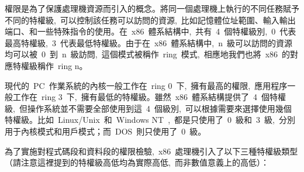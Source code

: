 權限是為了保護處理機資源而引入的概念。將同一個處理機上執行的不同任務賦予不同的特權級,~可以控制該任務可以訪問的資源,~比如記憶體位址範圍、輸入輸出端口、和一些特殊指令的使用。在~x86~體系結構中,~共有~4~個特權級別,~0~代表最高特權級,~3~代表最低特權級。由于在~x86~體系結構中,~n~級可以訪問的資源均可以被~0~到~n~級訪問,~這個模式被稱作~ring~模式,~相應地我們也將~x86~的對應特權級稱作~ring n。

現代的~PC~作業系統的內核一般工作在~ring 0~下,~擁有最高的權限,~應用程序一般工作在~ring 3~下,~擁有最低的特權級。雖然~x86~體系結構提供了~4~個特權級,~但操作系統並不需要全部使用到這~4~個級別,~可以根據需要來選擇使用幾個特權級。比如~Linux/Unix~和~Windows NT~,~都是只使用了~0~級和~3~級,~分別用于內核模式和用戶模式；而~DOS~則只使用了~0~級。

為了實施對程式碼段和資料段的權限檢驗,~x86~處理機引入了以下三種特權級類型（請注意這裡提到的特權級高低均為實際高低,~而非數值意義上的高低）：

